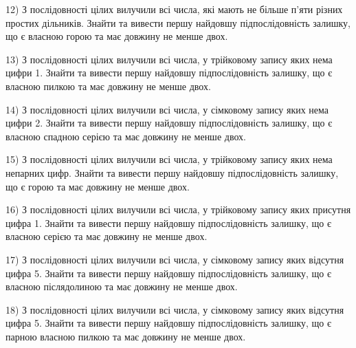 \documentclass[11pt, ukrainian]{article}
\begin{document}
\par
\vspace{0.9cm}
12) \space 
З послідовності цілих вилучили всі числа, які мають не більше п'яти різних простих дільників. Знайти та вивести першу найдовшу підпослідовність залишку, що є власною горою та має довжину не менше двох.

\par
\vspace{0.9cm}
13) \space 
З послідовності цілих вилучили всі числа, у трійковому запису яких нема цифри 1. Знайти та вивести першу найдовшу підпослідовність залишку, що є власною пилкою та має довжину не менше двох.

\par
\vspace{0.9cm}
14) \space 
З послідовності цілих вилучили всі числа, у сімковому запису яких нема цифри 2. Знайти та вивести першу найдовшу підпослідовність залишку, що є власною спадною серією та має довжину не менше двох.

\par
\vspace{0.9cm}
15) \space 
З послідовності цілих вилучили всі числа, у трійковому запису яких нема непарних цифр. Знайти та вивести першу найдовшу підпослідовність залишку, що є горою та має довжину не менше двох.

\par
\vspace{0.9cm}
16) \space 
З послідовності цілих вилучили всі числа, у трійковому запису яких присутня цифра 1. Знайти та вивести першу найдовшу підпослідовність залишку, що є власною серією та має довжину не менше двох.

\par
\vspace{0.9cm}
17) \space 
З послідовності цілих вилучили всі числа, у сімковому запису яких відсутня цифра 5. Знайти та вивести першу найдовшу підпослідовність залишку, що є власною післядолиною та має довжину не менше двох.

\par
\vspace{0.9cm}
18) \space 
З послідовності цілих вилучили всі числа, у сімковому запису яких відсутня цифра 5. Знайти та вивести першу найдовшу підпослідовність залишку, що є парною власною пилкою та має довжину не менше двох.
\end{document}
